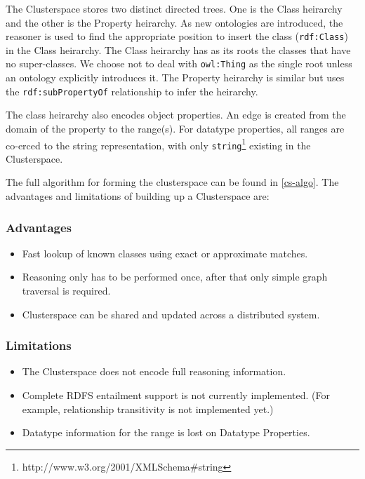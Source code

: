 \documentclass[conference]{IEEEtran}
\begin{document}
The Clusterspace stores two distinct directed trees. One is the Class heirarchy
and the other is the Property heirarchy. As new ontologies are introduced, the
reasoner is used to find the appropriate position to insert the class
(\texttt{rdf:Class}) in the Class heirarchy. The Class heirarchy has as its
roots the classes that have no super-classes. We choose not to deal with
\texttt{owl:Thing} as the single root unless an ontology explicitly introduces
it. The Property heirarchy is similar but uses the \texttt{rdf:subPropertyOf}
relationship to infer the heirarchy.

The class heirarchy also encodes object properties. An edge is created from the
domain of the property to the range(s). For datatype properties, all ranges are
co-erced to the string representation, with only
\texttt{string}\footnote{http://www.w3.org/2001/XMLSchema\#string} existing in
the Clusterspace.

The full algorithm for forming the clusterspace can be found in \ref{cs-algo}.
The advantages and limitations of building up a Clusterspace are:

\subsubsection*{Advantages}
\begin{itemize}
    \item Fast lookup of known classes using exact or approximate matches.
    \item Reasoning only has to be performed once, after that only simple graph
        traversal is required.
    \item Clusterspace can be shared and updated across a distributed system.
\end{itemize}

\subsubsection*{Limitations}
\begin{itemize}
    \item The Clusterspace does not encode full reasoning information.
    \item Complete RDFS entailment support is not currently implemented. (For
        example, relationship transitivity is not implemented yet.)
    \item Datatype information for the range is lost on Datatype Properties.
\end{itemize}
\end{document}
